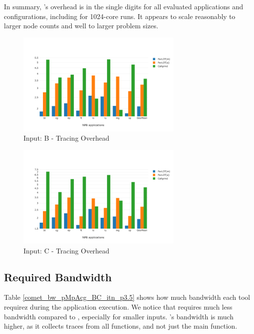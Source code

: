 In summary, \parlot 's overhead is in the single digits for all evaluated applications and configurations, including for 1024-core runs. It appears to scale reasonably to larger node counts and well to larger problem sizes.


\begin{figure}[!t]
\centering
\includegraphics[width=3.2in]{figs.comet.newMed/comet_chartAvg_sd_B_p3_5.png}
\caption{ Input: B - Tracing Overhead
}
\label{comet_chartAvg_sd_B_p3_5}
\end{figure}


\begin{figure}[!t]
\centering
\includegraphics[width=3.2in]{figs.comet.newMed/comet_chartAvg_sd_C_p3_5.png}
\caption{ Input: C - Tracing Overhead}
\label{comet_chartAvg_sd_C_p3_5}
\end{figure}






  
\subsection{Required Bandwidth}
\label{subsec:lowbw}



Table \ref{comet_bw_pMpAcg_BC_itn_p3.5} shows how much bandwidth each tool 
requirez
during the application execution. 
%
We notice that \parlotm requires much less bandwidth compared to
\callgrind, especially for smaller inputs. 
%
\parlota's bandwidth is much higher, as it collects traces from all
functions, and not just the main function.


